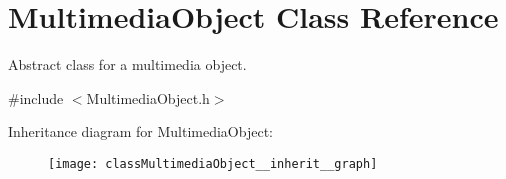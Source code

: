\hypertarget{classMultimediaObject}{}\section{Multimedia\+Object Class Reference}
\label{classMultimediaObject}


Abstract class for a multimedia object.  




{\ttfamily \#include $<$Multimedia\+Object.\+h$>$}



Inheritance diagram for Multimedia\+Object\+:
\nopagebreak
\begin{figure}[H]
\begin{center}
\leavevmode
\texttt{[image: classMultimediaObject\_\_inherit\_\_graph]}
\end{center}
\end{figure}
